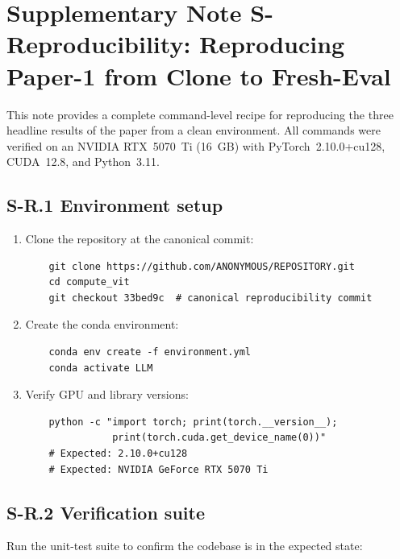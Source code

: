
\section*{Supplementary Note S-Reproducibility: Reproducing Paper-1 from Clone to Fresh-Eval}
\label{supp:reproducibility}

This note provides a complete command-level recipe for reproducing the three headline results of the paper from a clean environment. All commands were verified on an NVIDIA RTX~5070~Ti (16~GB) with PyTorch~2.10.0+cu128, CUDA~12.8, and Python~3.11.

\subsection*{S-R.1 Environment setup}

\begin{enumerate}[leftmargin=1.2em]
    \item Clone the repository at the canonical commit:
    \begin{verbatim}
    git clone https://github.com/ANONYMOUS/REPOSITORY.git
    cd compute_vit
    git checkout 33bed9c  # canonical reproducibility commit
    \end{verbatim}
    
    \item Create the conda environment:
    \begin{verbatim}
    conda env create -f environment.yml
    conda activate LLM
    \end{verbatim}
    
    \item Verify GPU and library versions:
    \begin{verbatim}
    python -c "import torch; print(torch.__version__); 
               print(torch.cuda.get_device_name(0))"
    # Expected: 2.10.0+cu128
    # Expected: NVIDIA GeForce RTX 5070 Ti
    \end{verbatim}
\end{enumerate}

\subsection*{S-R.2 Verification suite}

Run the unit-test suite to confirm the codebase is in the expected state:

